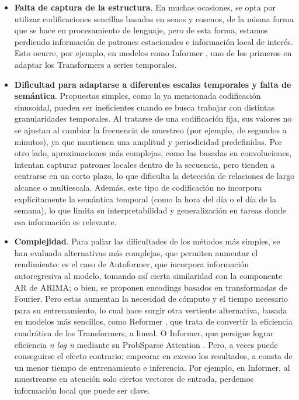 \begin{itemize}
	\item \textbf{Falta de captura de la estructura}. En muchas ocasiones, se opta por utilizar codificaciones sencillas basadas en senos y cosenos, de la misma forma que se hace en procesamiento de lenguaje, pero de esta forma, estamos perdiendo información de patrones estacionales e información local de interés. Esto ocurre, por ejemplo, en modelos como Informer \cite{zhou2021informerefficienttransformerlong}, uno de los primeros en adaptar los Transformers a series temporales.

	\item \textbf{Dificultad para adaptarse a diferentes escalas temporales y falta de semántica}. Propuestas simples, como la ya mencionada codificación sinusoidal, pueden ser ineficientes cuando se busca trabajar con distintas granularidades temporales. Al tratarse de una codificación fija, sus valores no se ajustan al cambiar la frecuencia de muestreo (por ejemplo, de segundos a minutos), ya que mantienen una amplitud y periodicidad predefinidas. Por otro lado, aproximaciones más complejas, como las basadas en convoluciones, intentan capturar patrones locales dentro de la secuencia, pero tienden a centrarse en un corto plazo, lo que dificulta la detección de relaciones de largo alcance o multiescala. Además, este tipo de codificación no incorpora explícitamente la semántica temporal (como la hora del día o el día de la semana), lo que limita su interpretabilidad y generalización en tareas donde esa información es relevante.
	

	\item \textbf{Complejidad}. Para paliar las dificultades de los métodos más simples, se han evaluado alternativas más complejas, que permiten aumentar el rendimiento: es el caso de Autoformer, que incorpora información autoregresiva al modelo, tomando así cierta similaridad con la componente AR de ARIMA; o bien, se proponen encodings basados en transformadas de Fourier. Pero estas aumentan la necesidad de cómputo y el tiempo necesario para su entrenamiento, lo cual hace surgir otra vertiente alternativa, basada en modelos más sencillos, como Reformer \cite{kitaev2020reformerefficienttransformer}, que trata de convertir la eficiencia cuadrática de los Transformers, a lineal. O Informer, que persigue lograr eficiencia \textit{n log n} mediante su ProbSparse Attention \cite{zhou2021informerefficienttransformerlong}. Pero, a veces puede conseguirse el efecto contrario: empeorar en exceso los resultados, a consta de un menor tiempo de entrenamiento e inferencia. Por ejemplo, en Informer, al muestrearse en atención solo ciertos vectores de entrada, perdemos información local que puede ser clave.
\end{itemize}

